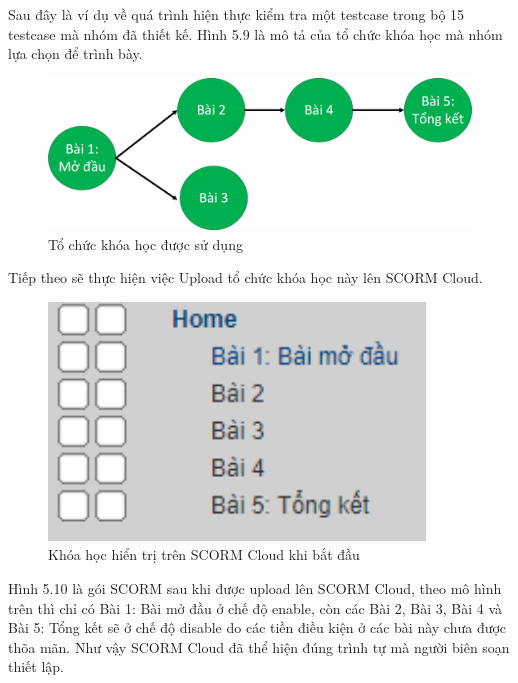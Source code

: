Sau đây là ví dụ về quá trình hiện thực kiểm tra một testcase trong bộ 15 testcase mà nhóm đã thiết kế. Hình 5.9 là mô tả của tổ chức khóa học mà nhóm lựa chọn để trình bày.

\begin{center}
	\begin{figure}[htp]
		\begin{center}
			\includegraphics[width=15cm]{Chapter5/Pictures/picture59.png}
		\end{center}
		\caption{Tổ chức khóa học được sử dụng}
		\label{refhinhchuong66}
	\end{figure}
\end{center}

Tiếp theo sẽ thực hiện việc Upload tổ chức khóa học này lên SCORM Cloud.

\begin{center}
	\begin{figure}[htp]
		\begin{center}
			\includegraphics[width=10cm]{Chapter5/Pictures/picture510.png}
		\end{center}
		\caption{Khóa học hiển trị trên SCORM Cloud khi bắt đầu}
		\label{refhinhchuong66}
	\end{figure}
\end{center}

Hình 5.10 là gói SCORM sau khi được upload lên SCORM Cloud, theo mô hình trên thì chỉ có Bài 1: Bài mở đầu ở chế độ enable, còn các Bài 2, Bài 3, Bài 4 và Bài 5: Tổng kết sẽ ở chế độ disable do các tiền điều kiện ở các bài này chưa được thõa mãn. Như vậy SCORM Cloud đã thể hiện đúng trình tự mà người biên soạn thiết lập.

